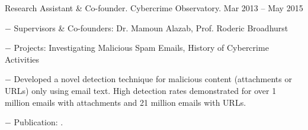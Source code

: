 \documentclass[10pt]{article}
\newcommand{\halfblankline}{\quad\vspace{-0.5\baselineskip}\pagebreak[3]}
\begin{document}
\begin{innerlist}
	\item Research Assistant \& Co-founder. Cybercrime Observatory. \hfill {Mar 2013 -- May 2015}
	\begin{innerlist}
		\item[$-$] Supervisors \& Co-founders: Dr. Mamoun Alazab, Prof. Roderic Broadhurst
		\item[$-$] Projects: Investigating Malicious Spam Emails, History of Cybercrime Activities
		\item[$-$] Developed a novel detection technique for malicious content (attachments or URLs) only using email text. High detection rates demonstrated for over 1 million emails with attachments and 21 million emails with URLs.
		\item[$-$] Publication: \cite{Tran2013c}.
	\end{innerlist}
	
	\halfblankline
	

\end{innerlist}
\end{document}
